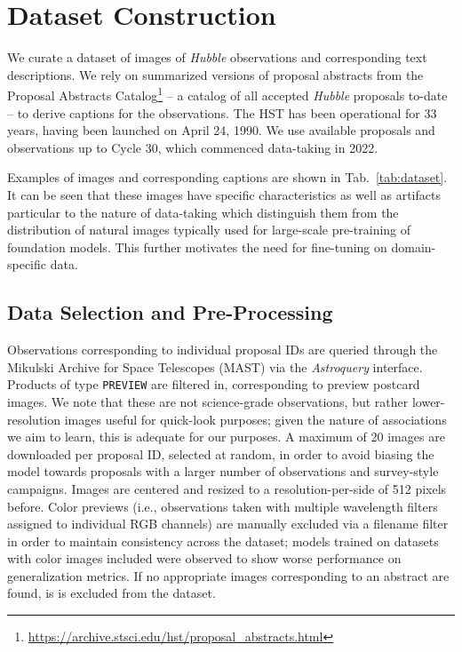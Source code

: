 \documentclass[10pt]{article} %
\newcommand{\package}[1]{\textsl{#1}\xspace}
\newcommand{\hubble}{\emph{Hubble}\xspace}
\begin{document}
\section{Dataset Construction}
\label{sec:dataset}

We curate a dataset of images of \hubble observations and corresponding text descriptions. We rely on summarized versions of proposal abstracts from the Proposal Abstracts Catalog\footnote{\url{https://archive.stsci.edu/hst/proposal_abstracts.html}} -- a catalog of all accepted \hubble proposals to-date -- to derive captions for the observations. The HST has been operational for 33 years, having been launched on April 24, 1990. We use available proposals and observations up to Cycle 30, which commenced data-taking in 2022. 

Examples of images and corresponding captions are shown in Tab.~\ref{tab:dataset}. It can be seen that these images have specific characteristics as well as artifacts particular to the nature of data-taking which distinguish them from the distribution of natural images typically used for large-scale pre-training of foundation models. This further motivates the need for fine-tuning on domain-specific data.

\subsection{Data Selection and Pre-Processing}

Observations corresponding to individual proposal IDs are queried through the Mikulski Archive for Space Telescopes (MAST) via the \package{Astroquery} interface. Products of type \texttt{PREVIEW} are filtered in, corresponding to preview postcard images. We note that these are not science-grade observations, but rather lower-resolution images useful for quick-look purposes; given the nature of associations we aim to learn, this is adequate for our purposes. A maximum of 20 images are downloaded per proposal ID, selected at random, in order to avoid biasing the model towards proposals with a larger number of observations and survey-style campaigns. Images are centered and resized to a resolution-per-side of 512 pixels before. Color previews (i.e., observations taken with multiple wavelength filters assigned to individual RGB channels) are manually excluded via a filename filter in order to maintain consistency across the dataset; models trained on datasets with color images included were observed to show worse performance on generalization metrics. If no appropriate images corresponding to an abstract are found, is is excluded from the dataset.
\end{document}
